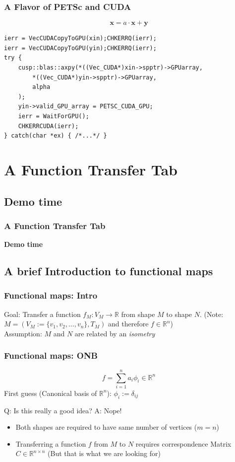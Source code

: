\documentclass[compress]{beamer}
\begin{document}
\begin{frame}[fragile]
\frametitle{A Flavor of PETSc and CUDA}
$$
	\mathbf{x} = a \cdot \mathbf{x} + \mathbf{y}
$$
\begin{lstlisting}
ierr = VecCUDACopyToGPU(xin);CHKERRQ(ierr);
ierr = VecCUDACopyToGPU(yin);CHKERRQ(ierr);
try {
    cusp::blas::axpy(*((Vec_CUDA*)xin->spptr)->GPUarray,
        *((Vec_CUDA*)yin->spptr)->GPUarray,
        alpha
    );
    yin->valid_GPU_array = PETSC_CUDA_GPU;
    ierr = WaitForGPU();
    CHKERRCUDA(ierr);
} catch(char *ex) { /*...*/ }
\end{lstlisting}

\end{frame}

\section{A Function Transfer Tab}
\subsection{Demo time}
\begin{frame}[fragile]
\frametitle{A Function Transfer Tab}
\bf{Demo time}
\end{frame}

\subsection{A brief Introduction to functional maps}
\begin{frame}
\frametitle{Functional maps: Intro}
Goal: Transfer a function $f_M:V_M \to \mathbb{R}$ from shape $M$ to shape $N$. (Note: $M = (V_M:=\{v_1, v_2, \dots, v_n\}, T_M)$ and therefore $f \in \mathbb{R}^n$)\\
Assumption: $M$ and $N$ are related by an \emph{isometry}
\end{frame}

\begin{frame}[fragile]
\frametitle{Functional maps: ONB}
$$
	f = \sum_{i=1}^{n} a_i\phi_i \in \mathbb{R}^n
$$
First guess (Canonical basis of $\mathbb{R}^n$): $\phi_i := \delta_{ij}$ \\

\begin{block}{}
Q: Is this really a good idea? A: Nope!
\begin{itemize}
	\item Both shapes are required to have same number of vertices ($m=n$)
	\item Transferring a function $f$ from $M$ to $N$ requires correspondence Matrix $C\in \mathbb{R}^{n \times n}$ (But that is what we are looking for)
\end{itemize}
\end{block}
\end{frame}
\end{document}
